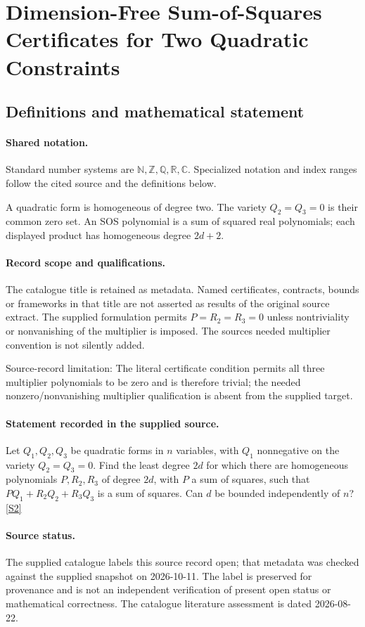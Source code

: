 \documentclass[11pt]{article}
\newcommand{\sref}[2]{\hyperlink{source:#1:#2}{[S#2]}}
\begin{document}
\section{Dimension-Free Sum-of-Squares Certificates for Two Quadratic Constraints}\label{statement}

\subsection{Definitions and mathematical statement}

\paragraph{Shared notation.}Standard number systems are $\mathbb N,\mathbb Z,\mathbb Q,\mathbb R,\mathbb C$. Specialized notation and index ranges follow the cited source and the definitions below.


A quadratic form is homogeneous of degree two. The variety $Q_2=Q_3=0$ is their common zero set. An SOS polynomial is a sum of squared real polynomials; each displayed product has homogeneous degree $2d+2$.
\paragraph{Record scope and qualifications.}
The catalogue title is retained as metadata. Named certificates, contracts, bounds or frameworks in that title are not asserted as results of the original source extract.
The supplied formulation permits $P=R_2=R_3=0$ unless nontriviality or nonvanishing of the multiplier is imposed. The source\textquotesingle s needed multiplier convention is not silently added.

Source-record limitation: The literal certificate condition permits all three multiplier polynomials to be zero and is therefore trivial; the needed nonzero/nonvanishing multiplier qualification is absent from the supplied target.
\paragraph{Statement recorded in the supplied source.}
Let $Q_1,Q_2,Q_3$ be quadratic forms in $n$ variables, with $Q_1$ nonnegative on the variety $Q_2=Q_3=0$. Find the least degree $2d$ for which there are homogeneous polynomials $P,R_2,R_3$ of degree $2d$, with $P$ a sum of squares, such that $PQ_1+R_2Q_2+R_3Q_3$ is a sum of squares. Can $d$ be bounded independently of $n$? \sref{statement}{2}
\paragraph{Source status.}
The supplied catalogue labels this source record open; that metadata was checked against the supplied snapshot on 2026-10-11. The label is preserved for provenance and is not an independent verification of present open status or mathematical correctness. The catalogue literature assessment is dated 2026-08-22.
\end{document}
